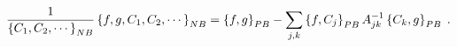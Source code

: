 \begin{equation}
\frac{1}{\left\{  C_{1},C_{2},\cdots\right\}  _{{\footnotesize NB}}}\left\{
f,g,C_{1},C_{2},\cdots\right\}  _{{\footnotesize NB}}=\left\{  f,g\right\}
_{{\footnotesize PB}}-\sum_{j,k}\left\{  f,C_{j}\right\}  _{{\footnotesize PB}%
}A_{jk}^{-1}\left\{  C_{k},g\right\}  _{{\footnotesize PB}}\;. \label{NBasDB}%
\end{equation}

